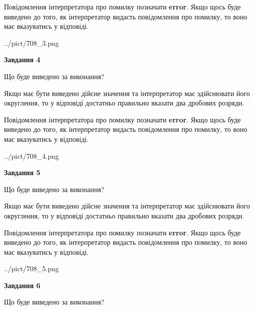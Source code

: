 \documentclass[12pt, ukrainian]{article}
\begin{document}
{\begin {Large}
Повідомлення інтерпретатора про помилку позначати \textbf{error}.
Якщо щось буде виведено до того, як інтерпретатор видасть повідомлення про помилку, 
то воно має вказуватись у відповіді. \par

\begin{center}
	{../pict/708_3.png}
\end{center}
\newpage

{\begin {center}\textbf{Завдання 4}\end {center}}\par
Що буде виведено за виконання? \par

Якщо має бути виведено дійсне значення та інтерпретатор має здійснювати його округлення, 
то у відповіді достатньо правильно вказати два дробових розряди.

Повідомлення інтерпретатора про помилку позначати \textbf{error}.
Якщо щось буде виведено до того, як інтерпретатор видасть повідомлення про помилку, 
то воно має вказуватись у відповіді. \par

\begin{center}
	{../pict/708_4.png}
\end{center}
\newpage

{\begin {center}\textbf{Завдання 5}\end {center}}\par
Що буде виведено за виконання? \par

Якщо має бути виведено дійсне значення та інтерпретатор має здійснювати його округлення, 
то у відповіді достатньо правильно вказати два дробових розряди.

Повідомлення інтерпретатора про помилку позначати \textbf{error}.
Якщо щось буде виведено до того, як інтерпретатор видасть повідомлення про помилку, 
то воно має вказуватись у відповіді. \par

\begin{center}
	{../pict/708_5.png}
\end{center}
\newpage

{\begin {center}\textbf{Завдання 6}\end {center}}\par
Що буде виведено за виконання? \par


\end{Large}}
\end{document}
